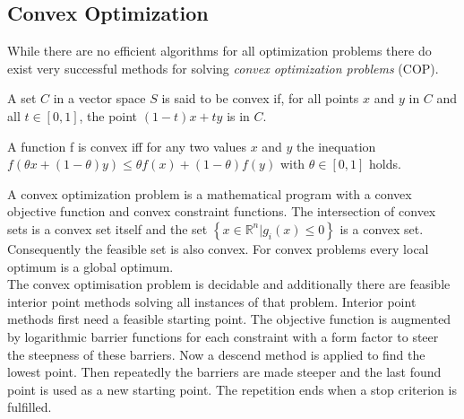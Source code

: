 \subsection{Convex Optimization}
While there are no efficient algorithms for all optimization problems there do exist very successful methods for solving \emph{convex optimization problems} (COP)\cite{Boyd04ConOpt}.
\begin{definition}
A set $C$ in a vector space $S$ is said to be convex if, for all points $x$ and $y$ in $C$ and all $t\in\left[0,1\right]$, the point $(1-t)x+ty$ is in $C$.
\end{definition}
\begin{definition}
A function f is convex iff for any two values $x$ and $y$ the inequation $ f(\theta x + (1-\theta) y)\leq \theta f(x)+(1-\theta) f(y)$ with $\theta\in \left[0,1\right] $ holds.
\end{definition}
A convex optimization problem is a mathematical program with a convex objective function and convex constraint functions. The intersection of convex sets is a convex set itself and the set $\left\lbrace x\in\mathbb{R}^n|g_i(x)\leq 0\right\rbrace$ is a convex set. Consequently the feasible set is also convex. For convex problems every local optimum is a global optimum.\\
The convex optimisation problem is decidable and additionally there are feasible interior point methods solving all instances of that problem. Interior point methods first need a feasible starting point. The objective function is augmented by logarithmic barrier functions for each constraint with a form factor to steer the steepness of these barriers. Now a descend method is applied to find the lowest point. Then repeatedly the barriers are made steeper and the last found point is used as a new starting point. The repetition ends when a stop criterion is fulfilled.
